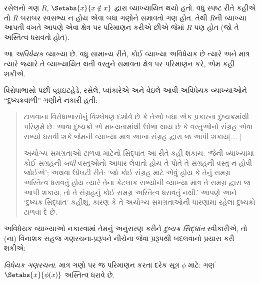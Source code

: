 \documentclass[../../../include/open-logic-section]{subfiles}
\begin{document}


રસેલનો ગણ $R$, $\Setabs{x}{x \notin
x}$ દ્વારા વ્યાખ્યાયિત થયો હતો. વધુ સ્પષ્ટ રીતે કહીએ તો $R$
બરાબર સ્વસભ્ય ન હોય એવા બધા ગણોને સમાવતો ગણ હોત. તેથી $R$ની
વ્યાખ્યા આપતી વખતે આપણે એવા ક્ષેત્ર પર પરિમાણન કરીએ છીએ જેમાં
$R$ પણ હોત (જો તે અસ્તિત્વ ધરાવતો હોત).

આ \emph{અવિધેયક} વ્યાખ્યા છે. વધુ સામાન્ય રીતે, કોઈ વ્યાખ્યા
અવિધેયક છે ત્યારે અને માત્ર ત્યારે જ્યારે તે વ્યાખ્યાયિત થતી
વસ્તુને સમાવતા ક્ષેત્ર પર પરિમાણન કરે, એમ કહી શકીએ.

વિરોધાભાસો પછી વ્હાઇટહેડે, રસેલે, પ્વાંકારેએ અને વેઇલે આવી
અવિધેયક વ્યાખ્યાઓને ``દુષ્ચક્રવાળી'' ગણીને નકારી હતી:
\begin{quote}
ટાળવાના વિરોધાભાસોનું વિશ્લેષણ દર્શાવે છે કે તેઓ બધા એક પ્રકારના
દુષ્ચક્રમાંથી પરિણમે છે. આવા દુષ્ચક્રો એ માન્યતામાંથી ઊભા થાય છે
કે વસ્તુઓનો સંગ્રહ એવા સભ્યો ધરાવી શકે જેમની વ્યાખ્યા માત્ર આખા
સંગ્રહ દ્વારા જ આપી શકાય[\ldots. \textparagraph]

અયોગ્ય સમગ્રતાઓ ટાળવા માટેનો સિદ્ધાંત આ રીતે કહી શકાય:
`જેની વ્યાખ્યામાં કોઈ સંગ્રહની \emph{બધી} વસ્તુઓનો આધાર લેવાતો હોય તે પોતે તે
સંગ્રહની વસ્તુ ન હોવી જોઈએ'; અથવા ઊલટી રીતે:
`જો કોઈ સંગ્રહ માટે એવું હોય કે તેનું સમગ્ર અસ્તિત્વ ધરાવતું હોય ત્યારે તેના કેટલાક
સભ્યોની વ્યાખ્યા માત્ર તે સમગ્ર દ્વારા જ આપી શકાય, તો તે
સંગ્રહનું કોઈ સમગ્ર અસ્તિત્વ ધરાવતું નથી.' આપણે આને
`દુષ્ચક્ર સિદ્ધાંત' કહીશું, કારણ કે તે અયોગ્ય સમગ્રતાઓની
ધારણામાં રહેલાં દુષ્ચક્રો ટાળવા દે છે.
\citep[p.~37]{WhiteheadRussell1910}
\end{quote}
અવિધેયક વ્યાખ્યાઓ નકારવામાં તેમનું અનુસરણ કરીને
\emph{દુષ્ચક્ર સિદ્ધાંત} સ્વીકારીએ, તો
(ના) વિનાશક સહજ ગણરચના-પ્રરૂપને
નીચેના જેવા પ્રરૂપથી બદલવાનો પ્રયાસ કરી શકીએ:

\begin{defish}
\emph{વિધેયક ગણરચના.} માત્ર ગણો પર જ પરિમાણન કરતા દરેક સૂત્ર $\phi$ માટે: ગણ$^\prime$ $\Setabs{x}{\phi(x)}$ અસ્તિત્વ ધરાવે છે.
\end{defish}
\end{document}
